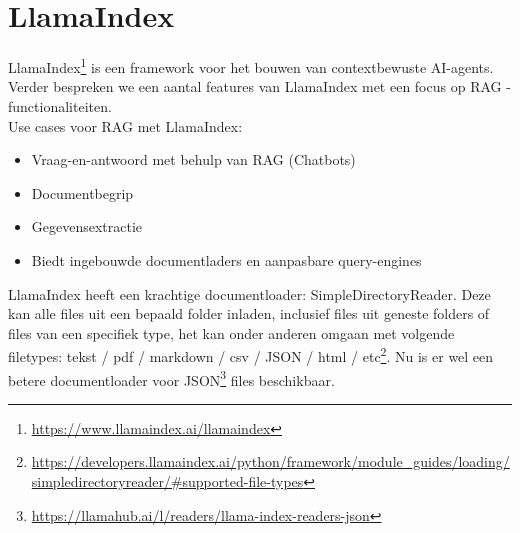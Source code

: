 \section{LlamaIndex}
\label{sec:llamaindex}

LlamaIndex\footnote{\href{https://www.llamaindex.ai/llamaindex}{https://www.llamaindex.ai/llamaindex}} is een framework voor het bouwen van contextbewuste AI-agents. Verder bespreken we een aantal features van LlamaIndex met een focus op RAG - functionaliteiten. \\

Use cases voor RAG met LlamaIndex: 
\begin{itemize}
    \item Vraag-en-antwoord met behulp van RAG (Chatbots)
    \item Documentbegrip
    \item Gegevensextractie
    \item Biedt ingebouwde documentladers en aanpasbare query-engines
\end{itemize}

LlamaIndex heeft een krachtige documentloader: SimpleDirectoryReader. Deze kan alle files uit een bepaald folder inladen, inclusief files uit geneste folders of files van een specifiek type, het kan onder anderen omgaan met volgende filetypes: tekst / pdf / markdown / csv / JSON / html / etc\footnote{\href{https://developers.llamaindex.ai/python/framework/module_guides/loading/simpledirectoryreader/\#supported-file-types}{https://developers.llamaindex.ai/python/framework/module\_guides/loading/simpledirectoryreader/\#supported-file-types}}. Nu is er wel een betere documentloader voor JSON\footnote{\href{https://llamahub.ai/l/readers/llama-index-readers-json}{https://llamahub.ai/l/readers/llama-index-readers-json}} files beschikbaar. \\







